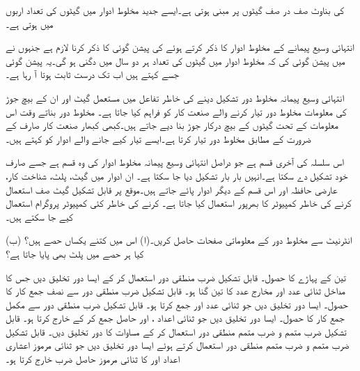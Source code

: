  کی بناوٹ صف در صف گیٹوں پر مبنی ہوتی ہے۔ایسے جدید مخلوط ادوار میں گیٹوں کی تعداد اربوں میں ہوتی ہے۔

انتہائی وسیع پیمانے کے مخلوط ادوار کا ذکر کرتے ہوئے  کی پیشن گوئی کا ذکر کرنا لازم ہے جنہوں نے  میں پیشن گوئی کی کہ مخلوط ادوار میں گیٹوں کی تعداد ہر دو سال میں دگنی ہو گی۔یہ پیشن گوئی جسے  کہتے ہیں اب تک درست ثابت ہوتا آ رہا ہے۔

انتہائی وسیع پیمانہ مخلوط دور تشکیل دینے کی خاطر تفاعل میں مستعمل گیٹ اور ان کے بیچ جوڑ کی معلومات مخلوط دور تیار کرنے والے صنعت کار کو فراہم کیا جاتا ہے۔ مخلوط دور بناتے وقت اس معلومات کے تحت گیٹوں کے بیچ درکار جوڑ بنا دیے جاتے ہیں۔کبھی کبھار صنعت کار صارف کے ضرورت کے مطابق مخلوط دور تیار کرتا ہے۔ایسے تیار کیے جانے والے ادوار کو کہتے ہیں۔

اس سلسلہ کی آخری قسم  ہے جو دراصل انتہائی وسیع پیمانہ مخلوط ادوار کی وہ قسم ہے جسے صارف خود تشکیل دے سکتا ہے۔انہیں بار بار تشکیل دیا جا سکتا ہے۔ ان ادوار میں گیٹ، پلٹ، شناخت کار، عارضی حافظہ اور اس قسم کے دیگر ادوار پائے جاتے ہیں۔موقع پر قابل تشکیل گیٹ صف استعمال کرنے کی خاطر کمپیوٹر کا بھرپور استعمال کیا جاتا ہے۔  کرنے کی خاطر کئی کمپیوٹر پروگرام استعمال کیے جا سکتے ہیں۔ 

انٹرنیٹ سے  مخلوط دور کے معلوماتی صفحات حاصل کریں۔(ا) اس میں کتنے یکساں حصے ہیں؟ (ب) کیا ہر حصے میں پلٹ بھی پایا جاتا ہے؟


تین کے  پہاڑے   کا  حصول۔ قابل تشکیل  ضرب   منطقی دور  استعمال کر کے ایسا دور تخلیق دیں جس کا مداخل ثنائی  عدد   اور مخارج    عدد کا تین گنا ہو۔
 قابل  تشکیل ضرب منطقی دور سے نصف  جمع کار کا حصول۔  ایسا دور تخلیق دیں جو ثنائی  عدد  اور   جمع کرتا ہو۔
 قابل  تشکیل ضرب منطقی دور سے مکمل   جمع کار کا حصول۔  ایسا دور تخلیق دیں جو ثنائی  اعداد ،  اور حاصل   جمع کر کے  خارج کرتا ہو۔
قابل تشکیل     ضرب متمم و ضرب متمم منطقی دور استعمال کر کے مساوات   کا دور تخلیق دیں۔
قابل تشکیل ضرب متمم و ضرب متمم منطقی دور استعمال کرتے ہوئے ایسا دور تخلیق دیں جو ثنائی مرموز اعشاری اعداد   اور    کا ثنائی مرموز  حاصل ضرب خارج   کرتا  ہو۔

